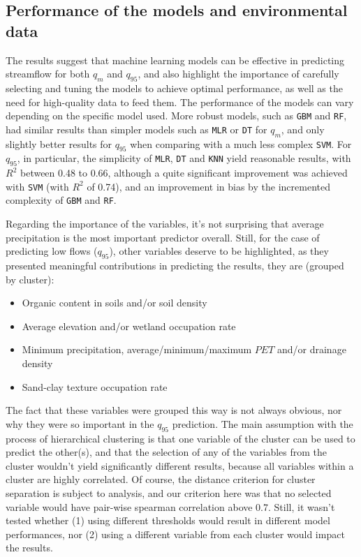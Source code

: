 \documentclass[12pt]{article}
\begin{document}
\subsection{Performance of the models and environmental data} \label{discussion:performance}

\par The results suggest that machine learning models can be effective in predicting streamflow for both $q_{m}$ and $q_{95}$, and also highlight the importance of carefully selecting and tuning the models to achieve optimal performance, as well as the need for high-quality data to feed them. The performance of the models can vary depending on the specific model used. More robust models, such as \texttt{GBM} and \texttt{RF}, had similar results than simpler models such as \texttt{MLR} or \texttt{DT} for $q_{m}$, and only slightly better results for $q_{95}$ when comparing with a much less complex \texttt{SVM}. For $q_{95}$, in particular, the simplicity of \texttt{MLR}, \texttt{DT} and \texttt{KNN} yield reasonable results, with $R^2$ between 0.48 to 0.66, although a quite significant improvement was achieved with \texttt{SVM} (with $R^2$ of 0.74), and an improvement in bias by the incremented complexity of \texttt{GBM} and \texttt{RF}.

\par Regarding the importance of the variables, it’s not surprising that average precipitation is the most important predictor overall. Still, for the case of predicting low flows ($q_{95}$), other variables deserve to be highlighted, as they presented meaningful contributions in predicting the results, they are (grouped by cluster):
\begin{itemize}
\item Organic content in soils and/or soil density
\item Average elevation and/or wetland occupation rate
\item Minimum precipitation, average/minimum/maximum $PET$ and/or drainage density
\item Sand-clay texture occupation rate
\end{itemize}

\par The fact that these variables were grouped this way is not always obvious, nor why they were so important in the $q_{95}$ prediction. The main assumption with the process of hierarchical clustering is that one variable of the cluster can be used to predict the other(s), and that the selection of any of the variables from the cluster wouldn’t yield significantly different results, because all variables within a cluster are highly correlated. Of course, the distance criterion for cluster separation is subject to analysis, and our criterion here was that no selected variable would have pair-wise spearman correlation above 0.7. Still, it wasn’t tested whether (1) using different thresholds would result in different model performances, nor (2) using a different variable from each cluster would impact the results.
\end{document}
